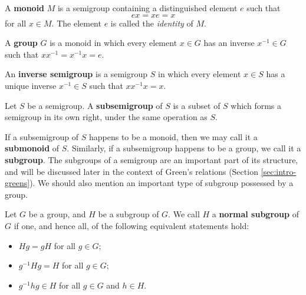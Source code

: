 \begin{definition}
  \label{def:monoid}
  A \textbf{monoid} $M$ is a semigroup containing a distinguished element $e$
  such that
  $$ex = xe = x$$
  for all $x \in M$.  The element $e$ is called the \textit{identity} of $M$.
\end{definition}

\begin{definition}
  \label{def:group}
  A \textbf{group} $G$ is a monoid in which every element $x \in G$ has an
  inverse $x^{-1} \in G$ such that $xx^{-1}=x^{-1}x = e$.
\end{definition}

\begin{definition}
  \label{def:inverse-semigroup}
  An \textbf{inverse semigroup} is a semigroup $S$ in which every element $x
  \in S$ has a unique inverse $x^{-1} \in S$ such that $xx^{-1}x=x$.
\end{definition}

\begin{definition}
  \label{def:subsemigroup}
  Let $S$ be a semigroup.  A \textbf{subsemigroup} of $S$ is a subset of $S$
  which forms a semigroup in its own right, under the same operation as $S$.
\end{definition}

If a subsemigroup of $S$ happens to be a monoid, then we may call it a
\textbf{submonoid} of $S$.  Similarly, if a subsemigroup happens to be a group,
we call it a \textbf{subgroup}.  The subgroups of a semigroup are an important
part of its structure, and will be discussed later in the context of Green's
relations (Section \ref{sec:intro-greens}).  We should also mention an important
type of subgroup possessed by a group.

\begin{definition}
  \label{def:normal-subgroup}
  Let $G$ be a group, and $H$ be a subgroup of $G$.  We call $H$ a
  \textbf{normal subgroup} of $G$ if one, and hence all, of the following
  equivalent statements hold:
  \begin{itemize}
  \item $Hg = gH$ for all $g \in G$;
  \item $g^{-1}Hg = H$ for all $g \in G$;
  \item $g^{-1}hg \in H$ for all $g \in G$ and $h \in H$.
  \end{itemize}
\end{definition}

